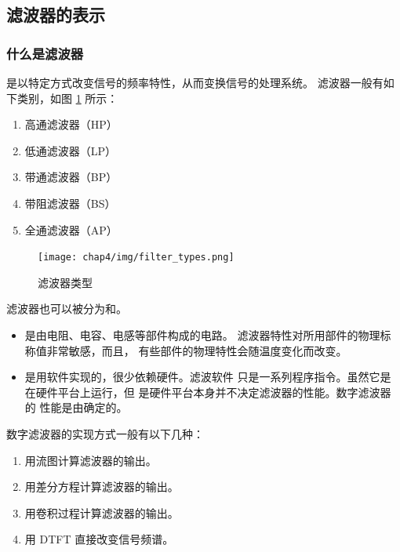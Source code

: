 \subsection{滤波器的表示}

\subsubsection{什么是滤波器}

\begin{definition}[滤波器]
    是以特定方式改变信号的频率特性，从而变换信号的处理系统。
    滤波器一般有如下类别，如图 \ref{fig:filter-types} 所示：
    \begin{enumerate}[label=(\arabic*)]
        \item 高通滤波器（HP）
        \item 低通滤波器（LP）
        \item 带通滤波器（BP）
        \item 带阻滤波器（BS）
        \item 全通滤波器（AP）
    \end{enumerate}
    \begin{figure}[H]
        \centering
        \texttt{[image: chap4/img/filter\_types.png]}
        \caption{滤波器类型}
        \label{fig:filter-types}
    \end{figure}

    滤波器也可以被分为和。
    \begin{itemize}
        \item {}是由电阻、电容、电感等部件构成的电路。
            滤波器特性对所用部件的物理标称值非常敏感，而且，
            有些部件的物理特性会随温度变化而改变。
        \item {}是用软件实现的，很少依赖硬件。滤波软件
            只是一系列程序指令。虽然它是在硬件平台上运行，但
            是硬件平台本身并不决定滤波器的性能。数字滤波器的
            性能是由确定的。
    \end{itemize}
    数字滤波器的实现方式一般有以下几种：
    \begin{enumerate}
        \item 用流图计算滤波器的输出。
        \item 用差分方程计算滤波器的输出。
        \item 用卷积过程计算滤波器的输出。
        \item 用 DTFT 直接改变信号频谱。
    \end{enumerate}
\end{definition}

